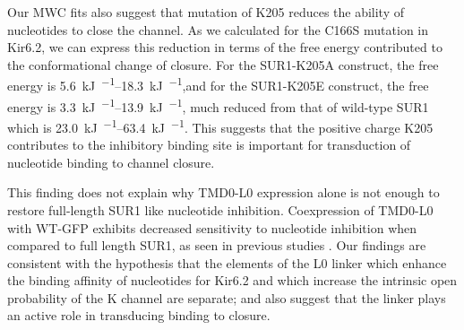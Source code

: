 Our MWC fits also suggest that mutation of K205 reduces the ability of nucleotides to close the channel.
As we calculated for the C166S mutation in Kir6.2, we can express this reduction in terms of the free energy contributed to the conformational change of closure.
For the SUR1-K205A construct, the free energy is \SIrange{5.6}{18.3}{\kilo\joule\per\Molar},and for the SUR1-K205E construct, the free energy is \SIrange{3.3}{13.9}{\kilo\joule\per\Molar}, much reduced from that of wild-type SUR1 which is \SIrange{23.0}{63.4}{\kilo\joule\per\Molar}.
This suggests that the positive charge K205 contributes to the inhibitory binding site is important for transduction of nucleotide binding to channel closure.

This finding does not explain why TMD0-L0 expression alone is not enough to restore full-length SUR1 like nucleotide inhibition.
Coexpression of TMD0-L0 with WT-GFP exhibits decreased sensitivity to nucleotide inhibition when compared to full length SUR1, as seen in previous studies \cite{babenko_sur_2003, chan_n-terminal_2003-1, pratt_n-terminal_2011}.
Our findings are consistent with the hypothesis that the elements of the L0 linker which enhance the binding affinity of nucleotides for Kir6.2 and which increase the intrinsic open probability of the K\ATP{} channel are separate; and also suggest that the linker plays an active role in transducing binding to closure.
